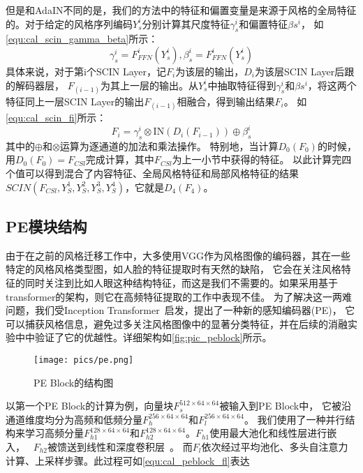 但是和AdaIN不同的是，我们的方法中的特征和偏置变量是来源于风格的全局特征的。对于给定的风格序列编码$Y_s^i$分别计算其尺度特征\(\gamma_{s}^{i}\)和偏置特征\(\beta{s}^{i}\)，
如\autoref{equ:cal_scin_gamma_beta}所示：
\begin{equation}
    \label{equ:cal_scin_gamma_beta}
    \gamma_s^i=F_{FFN}^i(Y_s^i),\beta_s^i=F_{FFN}^i(Y_s^i)
\end{equation}
具体来说，对于第i个SCIN Layer，记$F_i$为该层的输出，$D_i$为该层SCIN Layer后跟的解码器层， 
$F_{(i-1)}$为其上一层的输出。从$Y_s^i$中抽取特征得到\(\gamma_{s}^{i}\)和\(\beta{s}^{i}\)，将这两个特征同上一层SCIN Layer的输出$F_{(i-1)}$相融合，得到输出结果$F_i$。
如\autoref{equ:cal_scin_fi}所示：
\begin{equation}
    \label{equ:cal_scin_fi}
    F_i=\gamma_s^i\otimes\mathrm{IN}(D_i(F_{i-1}))\oplus\beta_s^i
\end{equation}
其中的$\oplus$和$\otimes$运算为逐通道的加法和乘法操作。
特别地，当计算\(D_0(F_0)\)的时候，用\(D_0(F_0)=F_{CSl}\)完成计算，其中$F_{CSl}$为上一小节中获得的特征。
以此计算完四个值可以得到混合了内容特征、全局风格特征和局部风格特征的结果\(SCIN(F_{CSl},Y_S^1,Y_S^2,Y_S^3,Y_S^4)\)，它就是\(D_4(F_4)\)。

\subsection{PE模块结构}

由于在之前的风格迁移工作中，大多使用VGG作为风格图像的编码器，其在一些特定的风格风格类型图，如人脸的特征提取时有天然的缺陷，
它会在关注风格特征的同时关注到比如人眼这种结构特征，而这是我们不需要的。如果采用基于transformer的架构，则它在高频特征提取的工作中表现不佳。
为了解决这一两难问题，我们受Inception Transformer~\cite{si2022inception}启发，提出了一种新的感知编码器(PE)，
它可以捕获风格信息，避免过多关注风格图像中的显著分类特征，并在后续的消融实验中中验证了它的优越性。详细架构如\autoref{fig:pic_peblock}所示。
\begin{figure}[h]
    \centering
    \texttt{[image: pics/pe.png]}
    \caption{\label{fig:pic_peblock}PE Block的结构图}
\end{figure}
以第一个PE Block的计算为例，向量块\(F_s^{512\times64\times64}\)被输入到PE Block中，
它被沿通道维度均分为高频和低频分量\(F_h^{256\times64\times64}\text{和}F_l^{256\times64\times64}\)。
我们使用了一种并行结构来学习高频分量\(F_{h1}^{128\times64\times64}\text{和}F_{h2}^{128\times64\times64}\)。$F_{h1}$使用最大池化和线性层进行嵌入，~\cite{szegedy2015going}
$F_{h2}$被馈送到线性和深度卷积层~\cite{mamalet2012simplifying,chollet2017xception}。
而$F_l$依次经过平均池化、多头自注意力计算、上采样步骤。此过程可如\autoref{equ:cal_peblock_fl}表达

